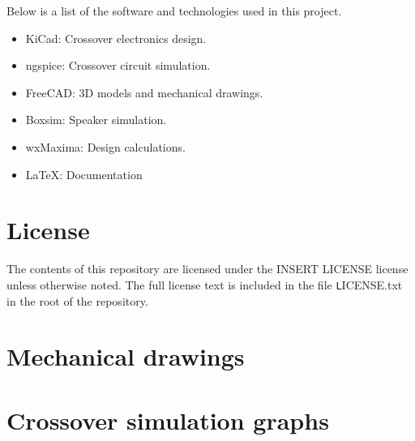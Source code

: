 \documentclass[10pt]{article}
\begin{document}
Below is a list of the software and technologies used in this project.

\begin{itemize}
\item KiCad: Crossover electronics design.
\item ngspice: Crossover circuit simulation.
\item FreeCAD: 3D models and mechanical drawings.
\item Boxsim: Speaker simulation.
\item wxMaxima: Design calculations.
\item LaTeX: Documentation
\end{itemize}

\section{License}

\noindent The contents of this repository are licensed under the INSERT
LICENSE license unless otherwise noted. The full license text is included in
the file \texttt LICENSE.txt in the root of the repository.

\pagebreak
\null
\vfil
\centering\section{Mechanical drawings}
\vfil
\pagebreak







\pagebreak
\null
\vfil
\centering\section{Crossover simulation graphs}
\vfil
\pagebreak






\end{document}
